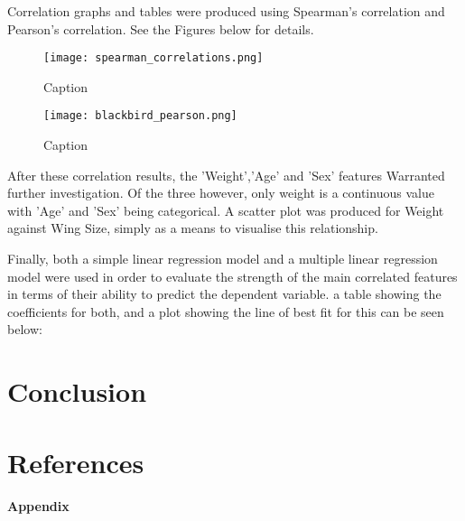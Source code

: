 \documentclass{article}
\begin{document}
Correlation graphs and tables were produced using Spearman's correlation and Pearson's correlation. See the Figures below for details.
\begin{figure}
    \centering
    \texttt{[image: spearman\_correlations.png]}
    \caption{Caption}
    \label{fig:my_label}
\end{figure}

\begin{figure}
    \centering
    \texttt{[image: blackbird\_pearson.png]}
    \caption{Caption}
    \label{fig:my_label}
\end{figure}

After these correlation results, the 'Weight','Age' and 'Sex' features Warranted further investigation. Of the three however, only weight is a continuous value with 'Age' and 'Sex' being categorical. A scatter plot was produced for Weight against Wing Size, simply as a means to visualise this relationship. 


Finally, both a simple linear regression model and a multiple linear regression model were used in order to evaluate the strength of the main correlated features in terms of their ability to predict the dependent variable. a table showing the coefficients for both, and a plot showing the line of best fit for this can be seen below:


\section{Conclusion}

\section{References}
\textbf{Appendix}
\end{document}
